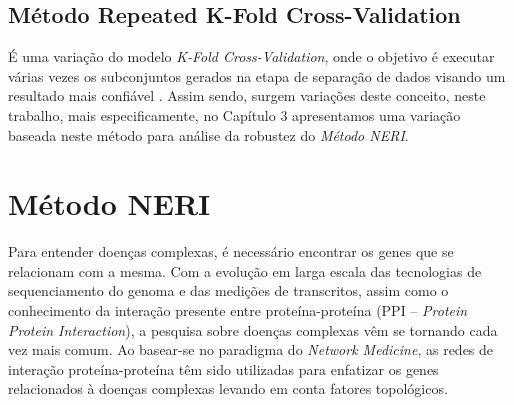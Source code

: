 \subsection{Método Repeated K-Fold Cross-Validation}

É uma variação do modelo \textsl{K-Fold Cross-Validation}, onde o objetivo é executar várias vezes os subconjuntos gerados na etapa de separação de dados visando um resultado mais confiável \cite{Mudry2011}. Assim sendo, surgem variações deste conceito, neste trabalho, mais especificamente, no Capítulo 3 apresentamos uma variação baseada neste método para análise da robustez do \textsl{Método NERI}.







\section{Método NERI}

Para entender doenças complexas, é necessário encontrar os genes que se relacionam com a mesma.
Com a evolução em larga escala das tecnologias de sequenciamento do genoma e das medições de transcritos, assim como o conhecimento da interação presente entre proteína-proteína (PPI – \textsl{Protein Protein Interaction}), a pesquisa sobre doenças complexas vêm se tornando cada vez mais comum.
Ao basear-se no paradigma do \textsl{Network Medicine}, as redes de interação proteína-proteína têm sido utilizadas para enfatizar os genes relacionados à doenças complexas levando em conta fatores topológicos. 

